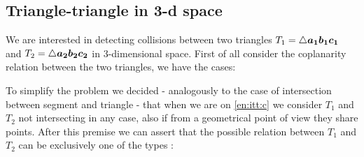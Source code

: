 \documentclass[dissertation.tex]{subfiles}
\begin{document}
\subsection{Triangle-triangle in 3-d space}\label{sec:intersectionsTriangleTriangle}
We are interested in detecting collisions between two triangles
$T_1=\triangle \boldsymbol{a_1}\boldsymbol{b_1}\boldsymbol{c_1}$ and $T_2=\triangle\boldsymbol{a_2}\boldsymbol{b_2}\boldsymbol{c_2}$ in 3-dimensional
space. First of all consider the coplanarity relation between the two
triangles, we have the cases:
To simplify the problem we decided - analogously to the case of
intersection between segment and triangle - that when we are on \cref{en:itt:c}
we consider $T_1$ and $T_2$ not intersecting in any case, also if from a
geometrical point of view they share points. After this premise we can
assert that the possible relation between $T_1$ and $T_2$ can be
exclusively one
of the types \cite{schneider}:
\end{document}
